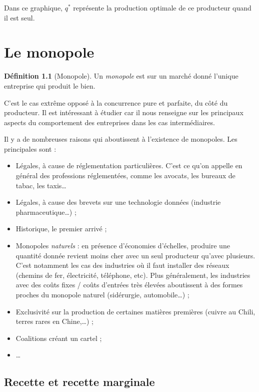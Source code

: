 \documentclass[
]{book}
\providecommand{\tightlist}{%
  \setlength{\itemsep}{0pt}\setlength{\parskip}{0pt}}
\theoremstyle{definition}
\newtheorem{definition}{Définition}[chapter]
\theoremstyle{definition}
\theoremstyle{definition}
\theoremstyle{definition}
\theoremstyle{remark}
\begin{document}
Dans ce graphique, \(q^*\) représente la production optimale de ce producteur quand il est seul.

\hypertarget{le-monopole}{%
\chapter{Le monopole}\label{le-monopole}}

\begin{definition}[Monopole]
Un \emph{monopole} est sur un marché donné l'unique entreprise qui produit le bien.
\end{definition}

C'est le cas extrême opposé à la concurrence pure et parfaite, du côté du producteur.
Il est intéressant à étudier car il nous renseigne sur les principaux aspects du comportement des entreprises dans les cas intermédiaires.

Il y a de nombreuses raisons qui aboutissent à l'existence de monopoles.
Les principales sont :

\begin{itemize}
\tightlist
\item
  Légales, à cause de réglementation particulières.
  C'est ce qu'on appelle en général des professions réglementées, comme les avocats, les bureaux de tabac, les taxis\ldots{}
\item
  Légales, à cause des brevets sur une technologie données (industrie pharmaceutique\ldots) ;
\item
  Historique, le premier arrivé ;
\item
  Monopoles \emph{naturels} : en présence d'économies d'échelles, produire une quantité donnée revient moins cher avec un seul producteur qu'avec plusieurs.
  C'est notamment les cas des industries où il faut installer des réseaux (chemins de fer, électricité, téléphone, etc).
  Plus généralement, les industries avec des coûts fixes / coûts d'entrées très élevées aboutissent à des formes proches du monopole naturel (sidérurgie, automobile\ldots) ;
\item
  Exclusivité sur la production de certaines matières premières (cuivre au Chili, terres rares en Chine,\ldots) ;
\item
  Coalitions créant un cartel ;
\item
  \ldots{}
\end{itemize}

\hypertarget{recette-et-recette-marginale}{%
\section{Recette et recette marginale}\label{recette-et-recette-marginale}}
\end{document}
